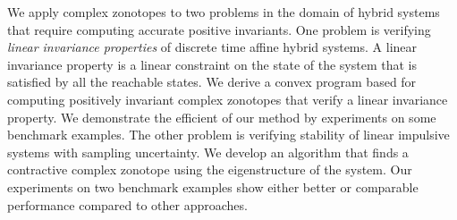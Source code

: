 We apply complex zonotopes to two problems in the domain of hybrid
systems that require computing accurate positive invariants.  One
problem is verifying \emph{linear invariance properties} of discrete
time affine hybrid systems.  A linear invariance property is a linear
constraint on the state of the system that is satisfied by all the
reachable states.  We derive a convex program based for computing
positively invariant complex zonotopes that verify a linear invariance
property.  We demonstrate the efficient of our method by experiments
on some benchmark examples.  The other problem is verifying stability
of linear impulsive systems with sampling uncertainty.  We develop an
algorithm that finds a contractive complex zonotope using the
eigenstructure of the system.  Our experiments on two benchmark
examples show either better or comparable performance compared to
other approaches.




